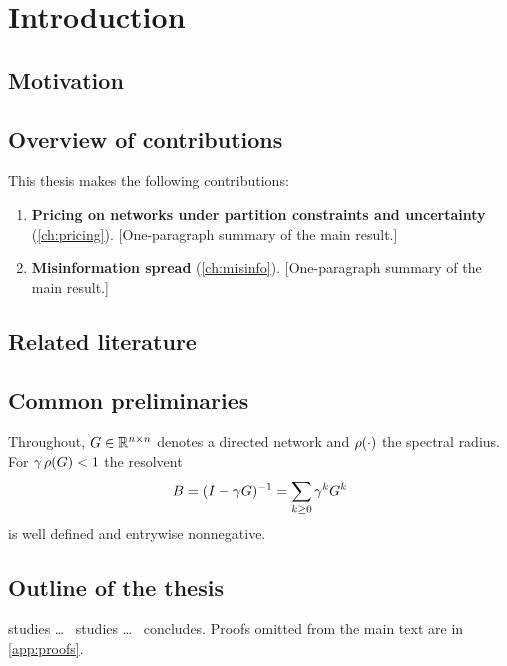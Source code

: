 \chapter{Introduction}
\label{ch:intro}


\section{Motivation}
\label{sec:intro:motivation}


\section{Overview of contributions}
\label{sec:intro:contributions}

This thesis makes the following contributions:
\begin{enumerate}
  \item \textbf{Pricing on networks under partition constraints and uncertainty} (\cref{ch:pricing}). [One-paragraph summary of the main result.]
  \item \textbf{Misinformation spread} (\cref{ch:misinfo}). [One-paragraph summary of the main result.]
\end{enumerate}

\section{Related literature}
\label{sec:intro:literature}


\section{Common preliminaries}
\label{sec:intro:prelims}

Throughout, $G \in \mathbb{R}^{n\times n}$ denotes a directed network and
$\rho(\cdot)$ the spectral radius. For $\gamma\,\rho(G) < 1$ the resolvent
\begin{equation}
  B = (I - \gamma G)^{-1} = \sum_{k \ge 0} \gamma^k G^k
  \label{eq:resolvent}
\end{equation}
is well defined and entrywise nonnegative.

\section{Outline of the thesis}
\label{sec:intro:outline}

 studies \ldots\  studies \ldots\
 concludes. Proofs omitted from the main text are in
\cref{app:proofs}.
